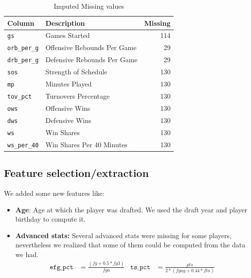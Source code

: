 \begin{table}[htb]
  \centering
  \caption{Imputed Missing values}%
  \label{tab:missing-values}
  \begin{tabular}{llr}
    \toprule
    \textbf{Column} & \textbf{Description} & \textbf{Missing} \\
    \midrule
    \texttt{gs}          & Games Started               & 114 \\
    \texttt{orb\_per\_g} & Offensive Rebounds Per Game & 29  \\
    \texttt{drb\_per\_g} & Defensive Rebounds Per Game & 29  \\
    \texttt{sos}         & Strength of Schedule        & 130 \\
    \texttt{mp}          & Minutes Played              & 130 \\
    \texttt{tov\_pct}    & Turnovers Percentage        & 130 \\
    \texttt{ows}         & Offensive Wins              & 130 \\
    \texttt{dws}         & Defensive Wins              & 130 \\
    \texttt{ws}          & Win Shares                  & 130 \\
    \texttt{ws\_per\_40} & Win Shares Per 40 Minutes   & 130 \\
    \bottomrule
  \end{tabular}
\end{table}

\subsection{Feature selection/extraction}%
\label{sub:feature-selection}

We added some new features like:
\begin{itemize}
    \item \textbf{Age}: Age at which the player was drafted. We used the draft year and player birthday to compute it.
    \item \textbf{Advanced stats:} Several advanced stats were missing for some players, nevertheless we realized that some of them could be computed from the data we had.
    \begin{align}
    \texttt{efg\_pct} &= \frac{(fg + 0.5 * fg3)}{fga} & \texttt{ts\_pct} &= \frac{pts}{2*(fgag + 0.44*fta)} \\
    \end{align}
\end{itemize}

